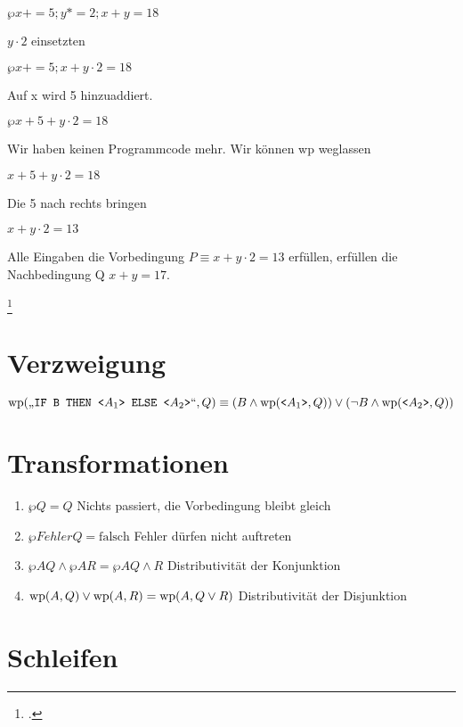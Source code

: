 \documentclass{lehramt-informatik-haupt}
\begin{document}
$\wp{x += 5; y *= 2;}{x + y = 18}$

$y \cdot 2$ einsetzten

$\wp{x += 5;}{x + y \cdot 2 = 18}$

Auf x wird 5 hinzuaddiert.

$\wp{}{x + 5 + y \cdot 2 = 18}$

Wir haben keinen Programmcode mehr. Wir können wp weglassen

$x + 5 + y \cdot 2 = 18$

Die 5 nach rechts bringen

$x + y \cdot 2 = 13$

Alle Eingaben die Vorbedingung $P \equiv x + y \cdot 2 = 13$ erfüllen,
erfüllen die Nachbedingung Q $x + y = 17$.

\footcite[Seite 21-26]{sosy:fs:5}

\section{Verzweigung}

$\text{\text{wp}}(\text{„}\texttt{IF B THEN <}A_1\texttt{> ELSE <}A_2\texttt{>}\text{“}, Q)
\equiv
(B \land \text{\text{wp}}(\texttt{<}A_1\texttt{>}, Q))
\lor
(\neg B \land \text{\text{wp}}(\texttt{<}A_2\texttt{>}, Q))$

\section{Transformationen}

\begin{enumerate}
\item $\wp{}{Q} = Q$
Nichts passiert, die Vorbedingung bleibt gleich

\item $\wp{Fehler}{Q} = \text{falsch}$
Fehler dürfen nicht auftreten

\item $\wp{A}{Q} \land \wp{A}{R} = \wp{A}{Q \land R}$
Distributivität der Konjunktion

\item $\text{\text{wp}}(A, Q) \lor \text{\text{wp}}(A, R) = \text{\text{wp}}(A, Q \lor R)$
Distributivität der Disjunktion
\end{enumerate}

%

\section{Schleifen}
\end{document}
